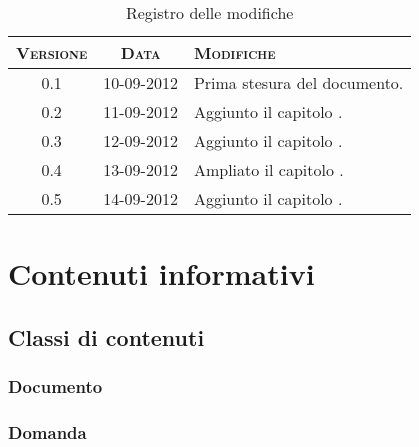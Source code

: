 \documentclass[10pt,a4paper,headinclude,footinclude,hidelinks]{scrreprt} %
\begin{document}
    \title{\rmfamily\normalfont{}}
    \author{}
    \date{\today}
    
    \maketitle
    
    \begin{abstract}
        \noindent Il documento presenta i risultati delle fasi di analisi e di progettazione dei nuovi criteri di classificazione.
    \end{abstract}
    
	\begin{table}[ht]
	\centering
	\begin{tabular}{|c|c|l|}
	\hline
	\textsc{Versione} & \textsc{Data} & \textsc{Modifiche} \\ \hline
	0.1 & 10-09-2012 & Prima stesura del documento. \\ \hline
	0.2 & 11-09-2012 & Aggiunto il capitolo \nameref{ch:stage:cls:contenuti}. \\ \hline
	0.3 & 12-09-2012 & Aggiunto il capitolo \nameref{ch:stage:cls:scenari}. \\ \hline
	0.4 & 13-09-2012 & Ampliato il capitolo \nameref{ch:stage:cls:scenari}. \\ \hline
	0.5 & 14-09-2012 & Aggiunto il capitolo \nameref{ch:stage:cls:requisiti}. \\ \hline
	\end{tabular}
	\caption{Registro delle modifiche}
	\label{tab:stage:wp:workload}
	\end{table}

	\tableofcontents
	\listoffigures
	\begingroup
	\let\clearpage\relax
	\listoftables
	\endgroup

	\chapter{Contenuti informativi}
	\label{ch:stage:cls:contenuti}
	\section{Classi di contenuti}
	\subsection{Documento}
	\subsection{Domanda}
\end{document}

